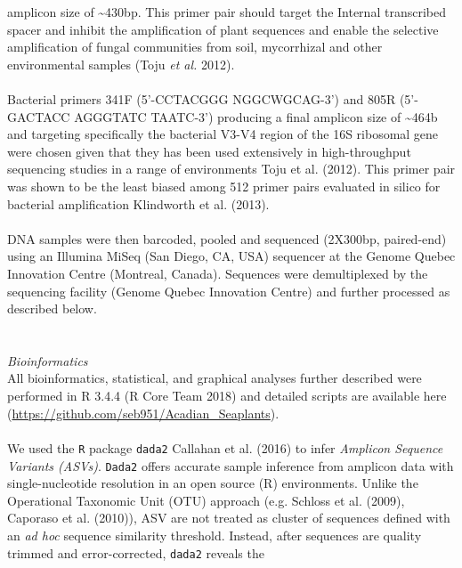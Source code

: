 \documentclass[11pt,]{article}
\begin{document}
amplicon size of \textasciitilde{}430bp. This primer pair should target
the Internal transcribed spacer and inhibit the amplification of plant
sequences and enable the selective amplification of fungal communities
from soil, mycorrhizal and other environmental samples (Toju \emph{et
al.} 2012).\\
\hspace*{0.333em}\\
Bacterial primers 341F (5'-CCTACGGG NGGCWGCAG-3') and 805R (5'-GACTACC
AGGGTATC TAATC-3') producing a final amplicon size of
\textasciitilde{}464b and targeting specifically the bacterial V3-V4
region of the 16S ribosomal gene were chosen given that they has been
used extensively in high-throughput sequencing studies in a range of
environments Toju et al. (2012). This primer pair was shown to be the
least biased among 512 primer pairs evaluated in silico for bacterial
amplification Klindworth et al. (2013).\\
\hspace*{0.333em}\\
DNA samples were then barcoded, pooled and sequenced (2X300bp,
paired-end) using an Illumina MiSeq (San Diego, CA, USA) sequencer at
the Genome Quebec Innovation Centre (Montreal, Canada). Sequences were
demultiplexed by the sequencing facility (Genome Quebec Innovation
Centre) and further processed as described below.\\
\hspace*{0.333em}\\
\hspace*{0.333em}\\
\emph{Bioinformatics}\\
All bioinformatics, statistical, and graphical analyses further
described were performed in R 3.4.4 (R Core Team 2018) and detailed
scripts are available here
(\url{https://github.com/seb951/Acadian_Seaplants}).\\
\hspace*{0.333em}\\
We used the \texttt{R} package \texttt{dada2} Callahan et al. (2016) to
infer \emph{Amplicon Sequence Variants (ASVs)}. \texttt{Dada2} offers
accurate sample inference from amplicon data with single-nucleotide
resolution in an open source (R) environments. Unlike the Operational
Taxonomic Unit (OTU) approach (e.g. Schloss et al. (2009), Caporaso et
al. (2010)), ASV are not treated as cluster of sequences defined with an
\emph{ad hoc} sequence similarity threshold. Instead, after sequences
are quality trimmed and error-corrected, \texttt{dada2} reveals the
\end{document}
